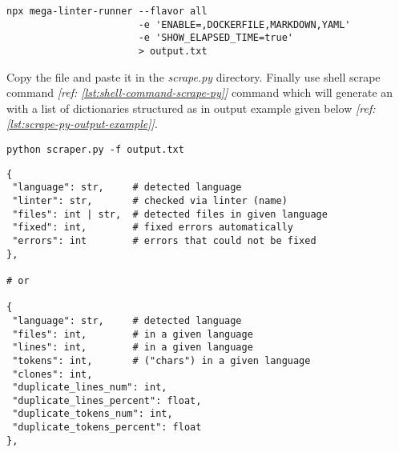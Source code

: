 \begin{lstlisting}[language=BashOwn, label={lst:shell-command-run-linter}, caption={"Running
\emph{Mega Linter}"}]
npx mega-linter-runner --flavor all
                       -e 'ENABLE=,DOCKERFILE,MARKDOWN,YAML'
                       -e 'SHOW_ELAPSED_TIME=true'
                       > output.txt
\end{lstlisting}

Copy the file and paste it in the \emph{scrape.py} directory. Finally use shell scrape command \textit{[ref: \ref{lst:shell-command-scrape-py}]} command which will generate an  with a list of dictionaries structured as in output example given below \textit{[ref: \ref{lst:scrape-py-output-example}]}.

\begin{lstlisting}[language=BashOwn, label={lst:shell-command-scrape-py}, caption={"Launching \code{scraper.py}"}]
python scraper.py -f output.txt
\end{lstlisting}

\begin{lstlisting}[language=PythonOwn, label={lst:scrape-py-output-example}, caption={"Parsed Linter Output in \code{.json} format"}]
{
 "language": str,     # detected language
 "linter": str,       # checked via linter (name)
 "files": int | str,  # detected files in given language
 "fixed": int,        # fixed errors automatically
 "errors": int        # errors that could not be fixed
},

# or

{
 "language": str,     # detected language
 "files": int,        # in a given language
 "lines": int,        # in a given language
 "tokens": int,       # ("chars") in a given language
 "clones": int,
 "duplicate_lines_num": int,
 "duplicate_lines_percent": float,
 "duplicate_tokens_num": int,
 "duplicate_tokens_percent": float
},
\end{lstlisting}
